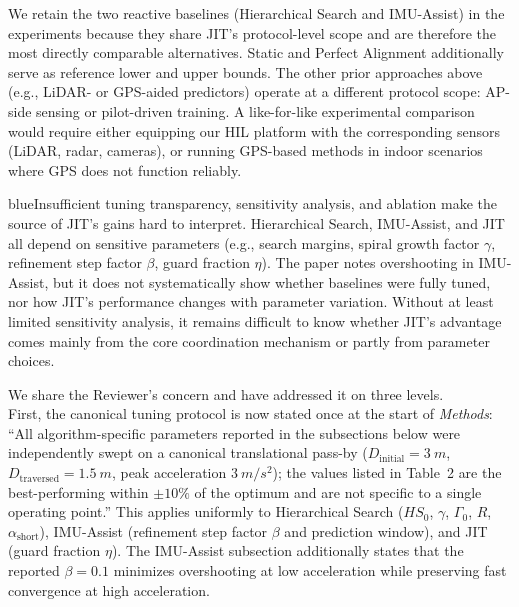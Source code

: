 \documentclass{article}
\newcommand{\blue}[1]{\begin{color}{blue}#1\end{color}}
\begin{document}
\noindent We retain the two reactive baselines (Hierarchical Search and IMU-Assist) in the experiments because they share JIT's protocol-level scope and are therefore the most directly comparable alternatives. Static and Perfect Alignment additionally serve as reference lower and upper bounds. The other prior approaches above (e.g., LiDAR- or GPS-aided predictors) operate at a different protocol scope: AP-side sensing or pilot-driven training. A like-for-like experimental comparison would require either equipping our HIL platform with the corresponding sensors (LiDAR, radar, cameras), or running GPS-based methods in indoor scenarios where GPS does not function reliably.

\begin{tcbremark}
{\selectfont
\blue{Insufficient tuning transparency, sensitivity analysis, and ablation make the source of JIT's gains hard to interpret. Hierarchical Search, IMU-Assist, and JIT all depend on sensitive parameters (e.g., search margins, spiral growth factor $\gamma$, refinement step factor $\beta$, guard fraction $\eta$). The paper notes overshooting in IMU-Assist, but it does not systematically show whether baselines were fully tuned, nor how JIT's performance changes with parameter variation. Without at least limited sensitivity analysis, it remains difficult to know whether JIT's advantage comes mainly from the core coordination mechanism or partly from parameter choices.}
}
\end{tcbremark}

\noindent We share the Reviewer's concern and have addressed it on three levels.\\

\noindent First, the canonical tuning protocol is now stated once at the start of \emph{Methods}: ``All algorithm-specific parameters reported in the subsections below were independently swept on a canonical translational pass-by ($D_{\text{initial}} = \SI{3}{m}$, $D_{\text{traversed}} = \SI{1.5}{m}$, peak acceleration $\SI{3}{m/s^2}$); the values listed in Table~2 are the best-performing within $\pm10\%$ of the optimum and are not specific to a single operating point.'' This applies uniformly to Hierarchical Search ($HS_0$, $\gamma$, $\Gamma_0$, $R$, $\alpha_{\text{short}}$), IMU-Assist (refinement step factor $\beta$ and prediction window), and JIT (guard fraction $\eta$). The IMU-Assist subsection additionally states that the reported $\beta = 0.1$ minimizes overshooting at low acceleration while preserving fast convergence at high acceleration.\\
\end{document}
